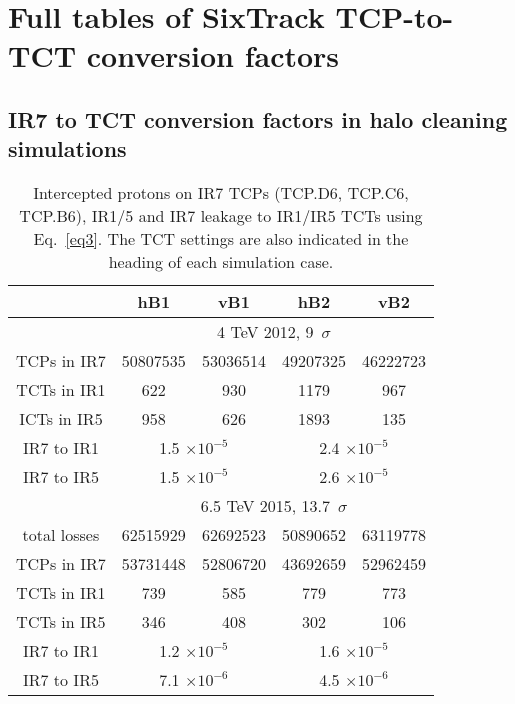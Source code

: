 \section{Full tables of SixTrack TCP-to-TCT conversion factors}
\subsection{IR7 to TCT conversion factors in halo cleaning simulations\label{leakageFactorsIR7}}
\begin{table}
   \centering
   \caption{Intercepted protons on IR7 TCPs (\textsc{TCP.D6, TCP.C6, TCP.B6}), IR1/5 and IR7 leakage to IR1/IR5 TCTs using Eq.~\ref{eq3}. The TCT settings are also indicated in the heading of each simulation case.}

   \begin{tabular}{c|cc|cc}

       & hB1 & vB1 & hB2 & vB2\\ \hline       
       & \multicolumn{4}{c}{4 TeV 2012, 9~$\sigma$} \\   %
       TCPs in IR7 & 50807535 & 53036514 & 49207325 & 46222723 \\
       TCTs in IR1 & 622 & 930 & 1179 & 967 \\
       ICTs in IR5 & 958 & 626 & 1893 & 135 \\ %
       IR7 to IR1  & \multicolumn{2}{c|}{1.5 $\times 10^{-5}$} & \multicolumn{2}{c}{2.4 $\times 10^{-5}$ } \\
       IR7 to IR5  & \multicolumn{2}{c|}{1.5 $\times 10^{-5}$} & \multicolumn{2}{c}{2.6 $\times 10^{-5}$ } \\
       \hline
       & \multicolumn{4}{c}{6.5 TeV 2015, 13.7~$\sigma$} \\      
       total losses & 62515929 & 62692523 & 50890652 & 63119778 \\
       TCPs in IR7 & 53731448 & 52806720 & 43692659 & 52962459 \\
       TCTs in IR1 & 739 & 585 & 779 & 773 \\
       TCTs in IR5 & 346 & 408 & 302 & 106 \\%
       IR7 to IR1 &  \multicolumn{2}{c|}{1.2 $\times 10^{-5}$} &  \multicolumn{2}{c}{1.6 $\times 10^{-5}$ } \\
       IR7 to IR5 &  \multicolumn{2}{c|}{7.1 $\times 10^{-6}$} &  \multicolumn{2}{c}{4.5 $\times 10^{-6}$ } \\
       \hline       


\end{tabular}
\end{table}
